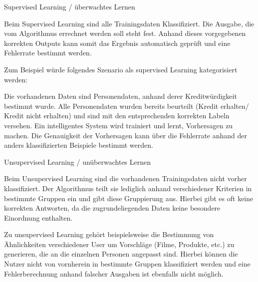 \begin{definition}
	\label{def: Supervised}
	Supervised Learning / überwachtes Lernen
	
	Beim Supervised Learning sind alle Trainingsdaten Klassifiziert. Die Ausgabe, die vom Algorithmus errechnet werden soll steht fest. Anhand dieses vorgegebenen korrekten Outputs kann somit das Ergebnis automatisch geprüft und eine Fehlerrate bestimmt werden. \cite{Basics-(un/semi)supervised}
	
	Zum Beispiel würde folgendes Szenario als supervised Learning kategorisiert werden:
	
	Die vorhandenen Daten sind Personendaten, anhand derer Kreditwürdigkeit bestimmt wurde. Alle Personendaten wurden bereits beurteilt (Kredit erhalten/ Kredit nicht erhalten) und sind mit den entsprechenden korrekten Labeln versehen. 
	Ein intelligentes System wird trainiert und lernt, Vorhersagen zu machen. Die Genauigkeit der Vorhersagen kann über die Fehlerrate anhand der anders klassifizierten Beispiele bestimmt werden. 
\end{definition}

\begin{definition}
	\label{def: Unsupervised}
	Unsupervised Learning / unüberwachtes Lernen
	
	Beim Unsupervised Learning sind die vorhandenen Trainingsdaten nicht vorher klassifiziert. Der Algorithmus teilt sie lediglich anhand verschiedener Kriterien in bestimmte Gruppen ein und gibt diese Gruppierung aus. Hierbei gibt es oft keine \glqq korrekten \grqq Antworten, da die zugrundeliegenden Daten keine besondere Einordnung enthalten. \cite{Basics-(un/semi)supervised}
	
	Zu unsupervised Learning gehört beispielsweise die Bestimmung von Ähnlichkeiten verschiedener User um Vorschläge (Filme, Produkte, etc.) zu generieren, die an die einzelnen Personen angepasst sind. Hierbei können die Nutzer nicht von vornherein in bestimmte Gruppen klassifiziert werden und eine Fehlerberechnung anhand falscher Ausgaben ist ebenfalls nicht möglich.
\end{definition}


